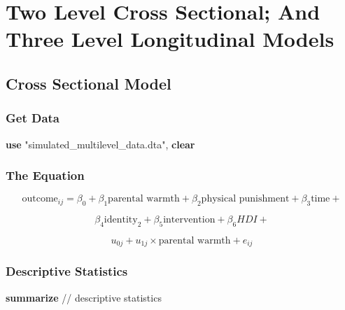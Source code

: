 \documentclass[
  letterpaper,
  DIV=11,
  numbers=noendperiod]{scrreprt}
\newenvironment{Shaded}{\begin{snugshade}}{\end{snugshade}}
\newcommand{\CommentTok}[1]{\textcolor[rgb]{0.37,0.37,0.37}{#1}}
\newcommand{\KeywordTok}[1]{\textcolor[rgb]{0.00,0.23,0.31}{\textbf{#1}}}
\newcommand{\NormalTok}[1]{\textcolor[rgb]{0.00,0.23,0.31}{#1}}
\newcommand{\StringTok}[1]{\textcolor[rgb]{0.13,0.47,0.30}{#1}}
\begin{document}

\chapter{Two Level Cross Sectional; And Three Level Longitudinal
Models}\label{two-level-cross-sectional-and-three-level-longitudinal-models}

\section{Cross Sectional Model}\label{cross-sectional-model}

\subsection{Get Data}\label{get-data}

\begin{Shaded}
\begin{Highlighting}[]

\KeywordTok{use} \StringTok{"simulated\_multilevel\_data.dta"}\NormalTok{, }\KeywordTok{clear}
\end{Highlighting}
\end{Shaded}

\subsection{The Equation}\label{the-equation}

\[\text{outcome}_{ij} = \beta_0 + \beta_1 \text{parental warmth} + \beta_2 \text{physical punishment} + \beta_3 \text{time} + \]

\[\beta_4 \text{identity}_2 + \beta_5 \text{intervention} + \beta_6 HDI +\]

\[u_{0j} + u_{1j} \times \text{parental warmth} + e_{ij} \]

\subsection{Descriptive Statistics}\label{descriptive-statistics}

\begin{Shaded}
\begin{Highlighting}[]

\KeywordTok{summarize} \CommentTok{// descriptive statistics}
\end{Highlighting}
\end{Shaded}
\end{document}
